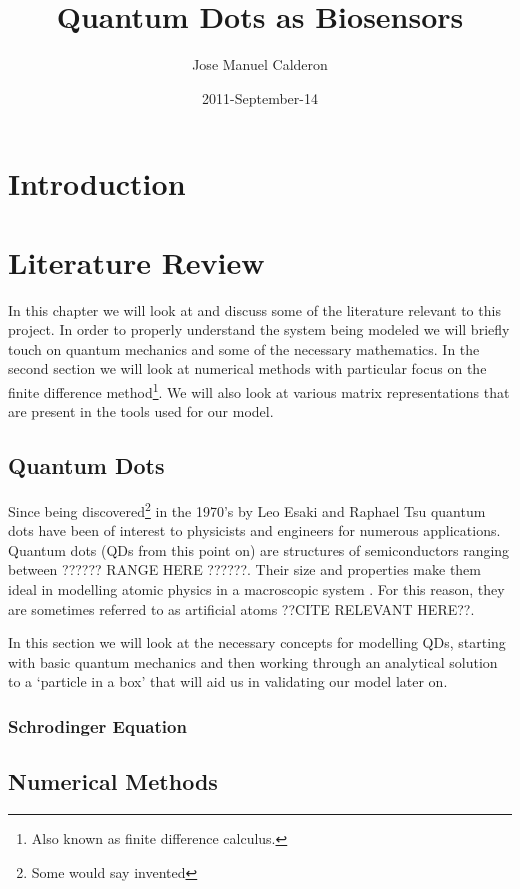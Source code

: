 \documentclass[authoryearcitations]{UoYCSproject}
\author{Jose Manuel Calderon}
\title{Quantum Dots as Biosensors}
\date{2011-September-14}
\begin{document}
 
\maketitle
\chapter{Introduction}

\chapter{Literature Review}
In this chapter we will look at and discuss some of the literature relevant to this project. 
In order to properly understand the system being modeled we will briefly touch on quantum mechanics
and some of the necessary mathematics. In the second section we will look at numerical methods with
particular focus on the finite difference method\footnote{Also known as finite difference calculus.}.
We will also look at various matrix representations that are present in the tools used for our
model. 
 
\section{Quantum Dots}
Since being discovered\footnote{Some would say invented} in the 1970's by Leo Esaki and 
Raphael Tsu quantum dots have been of interest to physicists and engineers for numerous applications. 
Quantum dots (QDs from this point on) are structures of semiconductors ranging between ??????
RANGE HERE ??????. Their size and properties make them ideal in modelling atomic physics in a
macroscopic system \cite{Li}. For this reason, they are sometimes referred to as artificial atoms 
??CITE RELEVANT HERE??.

In this section we will look at the necessary concepts for modelling QDs, starting with basic 
quantum mechanics and then working through an analytical solution to a `particle in a box' that
will aid us in validating our model later on.

 
\subsection{Schrodinger Equation}




\section{Numerical Methods}
\end{document}
